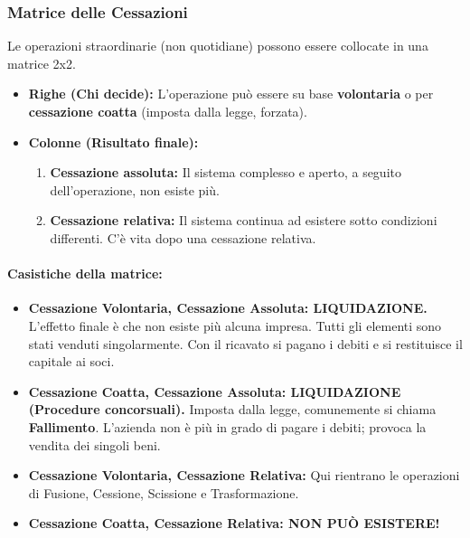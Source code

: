 \documentclass[a4paper,12pt]{article}
\begin{document}
	\subsubsection{Matrice delle Cessazioni}
	Le operazioni straordinarie (non quotidiane) possono essere collocate in una matrice 2x2. 
	\begin{itemize}
		\item \textbf{Righe (Chi decide):} L'operazione può essere su base \textbf{volontaria} o per \textbf{cessazione coatta} (imposta dalla legge, forzata).
		\item \textbf{Colonne (Risultato finale):} 
		\begin{enumerate}
			\item \textbf{Cessazione assoluta:} Il sistema complesso e aperto, a seguito dell'operazione, non esiste più.
			\item \textbf{Cessazione relativa:} Il sistema continua ad esistere sotto condizioni differenti. C'è vita dopo una cessazione relativa.
		\end{enumerate}
	\end{itemize}
	
	\paragraph{Casistiche della matrice:}
	\begin{itemize}
		\item \textbf{Cessazione Volontaria, Cessazione Assoluta: LIQUIDAZIONE.} L'effetto finale è che non esiste più alcuna impresa. Tutti gli elementi sono stati venduti singolarmente. Con il ricavato si pagano i debiti e si restituisce il capitale ai soci.
		\item \textbf{Cessazione Coatta, Cessazione Assoluta: LIQUIDAZIONE (Procedure concorsuali).} Imposta dalla legge, comunemente si chiama \textbf{Fallimento}. L'azienda non è più in grado di pagare i debiti; provoca la vendita dei singoli beni.
		\item \textbf{Cessazione Volontaria, Cessazione Relativa:} Qui rientrano le operazioni di Fusione, Cessione, Scissione e Trasformazione.
		\item \textbf{Cessazione Coatta, Cessazione Relativa: NON PUÒ ESISTERE!}
	\end{itemize}
	
\end{document}
